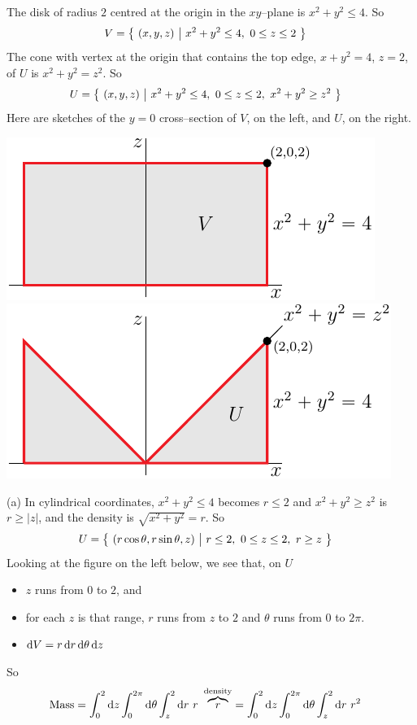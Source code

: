 \begin{solution}
The disk of radius $2$  centred at the origin in the $xy$--plane
is $x^2+y^2\le 4$. So
\begin{align*}
V&=\big\{ \ (x,y,z)\ \big|\ x^2+y^2\le 4,\ 0\le z\le 2\ \big\} 
\end{align*}
The cone with vertex at the origin that contains the top edge,
$x+y^2=4$, $z=2$, of $U$ is $x^2+y^2=z^2$. So
\begin{align*}
U&=\big\{ \ (x,y,z)\ \big|\ x^2+y^2\le 4,\ 0\le z\le 2,\ x^2+y^2\ge z^2\ \big\}
\end{align*} 
Here are sketches of the $y=0$ cross--section of $V$, on the left,
and $U$, on the right.
\begin{center}
     \includegraphics[scale=0.9]{fig/OE07A_8.pdf}\quad
     \includegraphics[scale=0.9]{fig/OE07A_8a.pdf}
\end{center}

(a) In cylindrical coordinates, $x^2+y^2\le 4$ becomes $r\le 2$
and $x^2+y^2\ge z^2$ is $r\ge |z|$, and the density is $\sqrt{x^2+y^2}=r$. 
So 
\begin{align*}
U&=\big\{ \ (r\cos\theta,r\sin\theta,z)\ \big|\ r\le 2,\ 0\le z\le 2,\ r\ge z\ \big\}
\end{align*}
Looking at the figure on the left below, we see that, on $U$
\begin{itemize}
\item 
  $z$ runs from $0$ to $2$, and
\item
  for each $z$ is that range, $r$ runs from $z$ to $2$
  and $\theta$ runs from $0$ to $2\pi$.
\item $\mathrm{d}V =r\,\mathrm{d}r\,\mathrm{d}\theta\,\mathrm{d}z$
\end{itemize}
So
\begin{align*}
\text{Mass}&= \int_0^2\dee{z}\int_0^{2\pi}\dee{\theta}\int_z^2\dee{r}\ 
                  r\ \overbrace{r}^{\text{density}}
= \int_0^2\dee{z}\int_0^{2\pi}\dee{\theta}\int_z^2\dee{r}\ 
                  r^2
\end{align*}


\end{solution}
